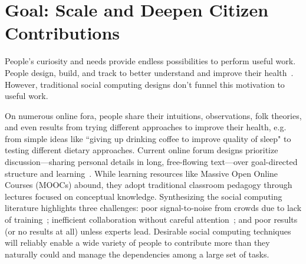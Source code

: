 \section {Goal: Scale and Deepen Citizen Contributions}
People's curiosity and needs provide endless possibilities to perform useful work. People design, build, and track to better understand and improve their health~\cite{DanaLewis}. However, traditional social computing designs don’t funnel this motivation to useful work. 

On numerous online fora, people share their intuitions, observations, folk theories, and even results from trying different approaches to improve their health, e.g. from simple ideas like ``giving up drinking coffee to improve quality of sleep" to testing different dietary approaches. 
Current online forum designs prioritize discussion---sharing personal details in long, free-flowing text---over goal-directed structure and learning~\cite{Thomas2002}. While learning resources like Massive Open Online Courses (MOOCs) abound, they adopt traditional classroom pedagogy through lectures focused on conceptual knowledge. Synthesizing the social computing literature highlights three challenges: poor signal-to-noise from crowds due to lack of training~\cite{Doroudi2016a}; inefficient collaboration without careful attention~\cite{Resnick2011}; and poor results (or no results at all) unless experts lead. Desirable social computing techniques will reliably enable a wide variety of people to contribute more than they naturally could and manage the dependencies among a large set of tasks. 





